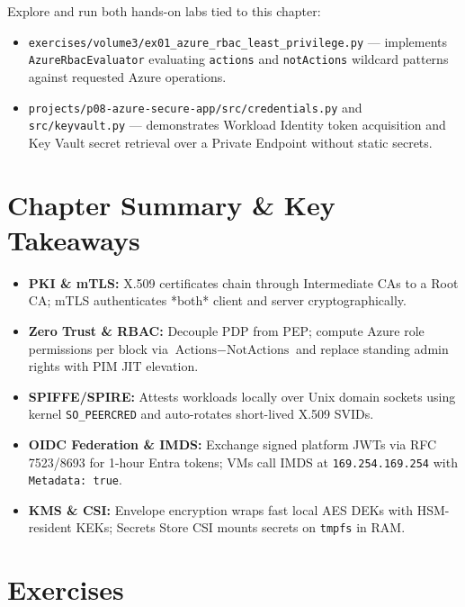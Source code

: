 \begin{labbridgebox}
Explore and run both hands-on labs tied to this chapter:
\begin{itemize}[leftmargin=12pt]
  \item \texttt{exercises/volume3/ex01\_azure\_rbac\_least\_privilege.py} --- implements \texttt{AzureRbacEvaluator} evaluating \texttt{actions} and \texttt{notActions} wildcard patterns against requested Azure operations.
  \item \texttt{projects/p08-azure-secure-app/src/credentials.py} and \texttt{src/keyvault.py} --- demonstrates Workload Identity token acquisition and Key Vault secret retrieval over a Private Endpoint without static secrets.
\end{itemize}
\end{labbridgebox}

\section{Chapter Summary \protect\& Key Takeaways}
\begin{itemize}[leftmargin=15pt]
  \item \textbf{PKI \& mTLS:} X.509 certificates chain through Intermediate CAs to a Root CA; mTLS authenticates *both* client and server cryptographically.
  \item \textbf{Zero Trust \& RBAC:} Decouple PDP from PEP; compute Azure role permissions per block via $\text{Actions} - \text{NotActions}$ and replace standing admin rights with PIM JIT elevation.
  \item \textbf{SPIFFE/SPIRE:} Attests workloads locally over Unix domain sockets using kernel \texttt{SO\_PEERCRED} and auto-rotates short-lived X.509 SVIDs.
  \item \textbf{OIDC Federation \& IMDS:} Exchange signed platform JWTs via RFC 7523/8693 for 1-hour Entra tokens; VMs call IMDS at \texttt{169.254.169.254} with \texttt{Metadata: true}.
  \item \textbf{KMS \& CSI:} Envelope encryption wraps fast local AES DEKs with HSM-resident KEKs; Secrets Store CSI mounts secrets on \texttt{tmpfs} in RAM.
\end{itemize}

\section{Exercises}

